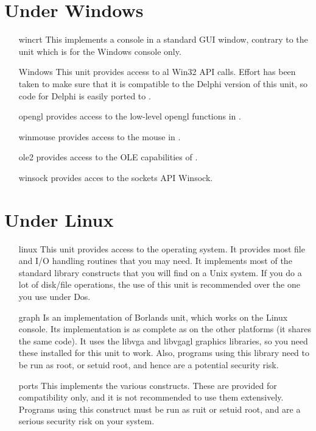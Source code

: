 \section{Under Windows}
\begin{itemize}
\item [wincrt] This implements a console in a standard GUI window, contrary
to the  unit which is for the Windows console only.
\item [Windows] This unit provides access to al Win32 API calls. Effort has
been taken to make sure that it is compatible to the Delphi version of this
unit, so code for Delphi is easily ported to \fpc.
\item[opengl] provides access to the low-level opengl functions in \windows.
\item[winmouse] provides access to the mouse in \windows.
\item[ole2] provides access to the OLE capabilities of \windows.
\item[winsock] provides acces to the \windows sockets API Winsock.
\end{itemize}

%
%
\section{Under Linux}
\begin{itemize}
\item [linux] This unit provides access to the
\linux operating system. It provides most file and I/O handling routines
that you may need. It implements most of the standard  library constructs
that you will find on a Unix system. If you do a lot of disk/file
operations, the use of this unit is recommended over the one you use under
Dos.
\item [graph] Is an implementation of Borlands  unit, which
works on the Linux console. Its implementation is as complete as on
the other platforms (it shares the same code).
It uses the libvga and libvgagl graphics libraries, so you need these
installed for this unit to work. Also, programs using this library need
to be run as root, or setuid root, and hence are a potential security risk.
\item [ports] This implements the various  constructs. These are
provided for compatibility only, and it is not recommended to use them
extensively. Programs using this construct must be run as ruit or setuid
root, and are a serious security risk on your system.
\end{itemize}

